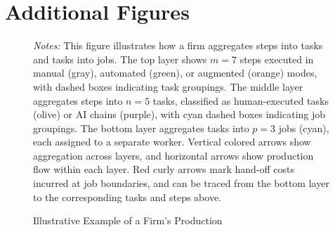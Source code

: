\section{Additional Figures}
\label{app:figures}

\renewcommand{\thefigure}{A.\arabic{figure}}
\setcounter{figure}{0}

\begin{figure}[h!]
  \begin{center}
  \caption{Illustrative Example of a Firm's Production}
  \label{fig:hierarchical_production}
  
  \vspace{0.4cm}
  
  \end{center}
  
  \vspace{0.4cm}
  \raggedright \footnotesize{\emph{Notes:} 
  This figure illustrates how a firm aggregates steps into tasks and tasks into jobs. 
  The top layer shows $m=7$ steps executed in manual (gray), automated (green), or augmented (orange) modes, with dashed boxes indicating task groupings. 
  The middle layer aggregates steps into $n=5$ tasks, classified as human-executed tasks (olive) or AI chains (purple), with cyan dashed boxes indicating job groupings. 
  The bottom layer aggregates tasks into $p=3$ jobs (cyan), each assigned to a separate worker. 
  Vertical colored arrows show aggregation across layers, and horizontal arrows show production flow within each layer. 
  Red curly arrows mark hand-off costs incurred at job boundaries, and can be traced from the bottom layer to the corresponding tasks and steps above. 
  }
\end{figure}




